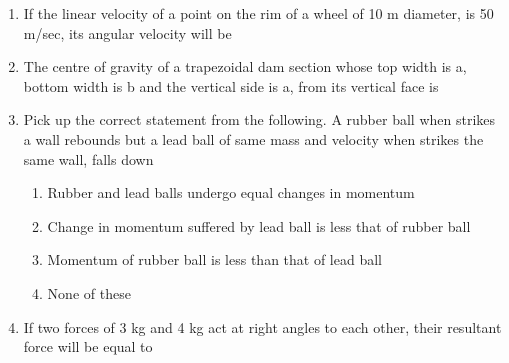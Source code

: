 \documentclass[11pt,a4paper]{article}
\begin{document}
\begin{enumerate}
\begin{enumerate*}[itemjoin=\qquad, label=\Alph*.]
\end{enumerate*}
\item{If the linear velocity of a point on the rim of a wheel of 10 m diameter, is 50 m/sec, its angular velocity will be}
\\
\item{The centre of gravity of a trapezoidal dam section whose top width is a, bottom width is b and the vertical side is a, from its vertical face is}
\\
\item{Pick up the correct statement from the following. A rubber ball when strikes a wall rebounds but a lead ball of same mass and velocity when strikes the same wall, falls down}
\begin{enumerate}[label=\Alph*.]
\item{Rubber and lead balls undergo equal changes in momentum}
\item{Change in momentum suffered by lead ball is less that of rubber ball}
\item{Momentum of rubber ball is less than that of lead ball}
\item{None of these}
\end{enumerate}
\item{If two forces of 3 kg and 4 kg act at right angles to each other, their resultant force will be equal to}
\\
\end{enumerate}
\end{document}
